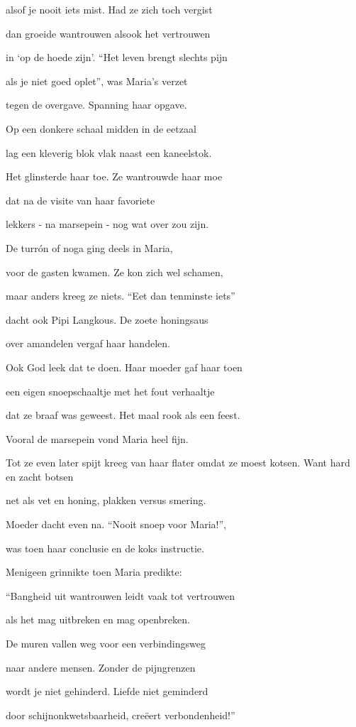 alsof je nooit iets mist.
Had ze zich toch vergist

dan groeide wantrouwen
alsook het vertrouwen

in ‘op de hoede zijn’.
“Het leven brengt slechts pijn

als je niet goed oplet”,
was Maria’s verzet

tegen de overgave.
Spanning haar opgave.

Op een donkere schaal
midden in de eetzaal

lag een kleverig blok
vlak naast een kaneelstok.

Het glinsterde haar toe.
Ze wantrouwde haar moe

dat na de visite
van haar favoriete

lekkers - na marsepein -
nog wat over zou zijn.

De turrón of noga
ging deels in Maria,

voor de gasten kwamen.
Ze kon zich wel schamen,

maar anders kreeg ze niets.
“Eet dan tenminste iets”

dacht ook Pipi Langkous.
De zoete honingsaus

over amandelen
vergaf haar handelen.

Ook God leek dat te doen.
Haar moeder gaf haar toen

een eigen snoepschaaltje
met het fout verhaaltje

dat ze braaf was geweest.
Het maal rook als een feest.

Vooral de marsepein
vond Maria heel fijn.

Tot ze even later
spijt kreeg van haar flater
omdat ze moest kotsen.
Want hard en zacht botsen

net als vet en honing,
plakken versus smering.

Moeder dacht even na.
“Nooit snoep voor Maria!”,

was toen haar conclusie
en de koks instructie.

Menigeen grinnikte
toen Maria predikte:

“Bangheid uit wantrouwen
leidt vaak tot vertrouwen

als het mag uitbreken
en mag openbreken.

De muren vallen weg
voor een verbindingsweg

naar andere mensen.
Zonder de pijngrenzen

wordt je niet gehinderd.
Liefde niet geminderd

door schijnonkwetsbaarheid,
creëert verbondenheid!”

